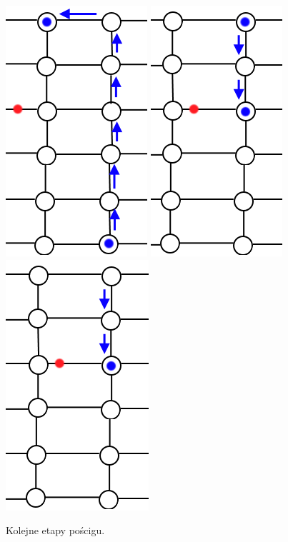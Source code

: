 \documentclass[brudnopis]{xmgr}
\begin{document}
\begin{figure}[ht!]
  \includegraphics{rysunki/poscig_4.png}
  \includegraphics{rysunki/poscig_5.png}
  \includegraphics{rysunki/poscig_6_koniec.png}
  \caption{Kolejne etapy pościgu.}
\end{figure} 
\end{document}
